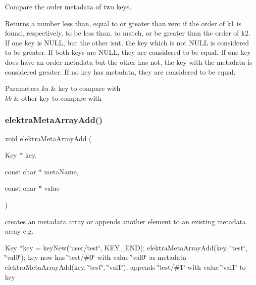 Compare the order metadata of two keys. 

\begin{DoxyReturn}{Returns}
a number less than, equal to or greater than zero if the order of k1 is found, respectively, to be less than, to match, or be greater than the order of k2. If one key is N\+U\+LL, but the other isn\textquotesingle{}t, the key which is not N\+U\+LL is considered to be greater. If both keys are N\+U\+LL, they are considered to be equal. If one key does have an order metadata but the other has not, the key with the metadata is considered greater. If no key has metadata, they are considered to be equal.
\end{DoxyReturn}

\begin{DoxyParams}{Parameters}
{\em ka} & key to compare with \\
\hline
{\em kb} & other key to compare with \\
\hline
\end{DoxyParams}
\mbox{\label{group__meta_ga166c65c4eb2d758ced57b0bd74fb9a57}} 
\subsubsection{\texorpdfstring{elektra\+Meta\+Array\+Add()}{elektraMetaArrayAdd()}}
{\footnotesize\ttfamily void elektra\+Meta\+Array\+Add (\begin{DoxyParamCaption}\item[{Key $\ast$}]{key,  }\item[{const char $\ast$}]{meta\+Name,  }\item[{const char $\ast$}]{value }\end{DoxyParamCaption})}



creates an metadata array or appends another element to an existing metadata array e.\+g. 

Key $\ast$key = key\+New(\char`\"{}user/test\char`\"{}, K\+E\+Y\+\_\+\+E\+ND); elektra\+Meta\+Array\+Add(key, \char`\"{}test\char`\"{}, \char`\"{}val0\char`\"{}); key now has \char`\"{}test/\#0\char`\"{} with value \char`\"{}val0\char`\"{} as metadata elektra\+Meta\+Array\+Add(key, \char`\"{}test\char`\"{}, \char`\"{}val1\char`\"{}); appends \char`\"{}test/\#1\char`\"{} with value \char`\"{}val1\char`\"{} to key


